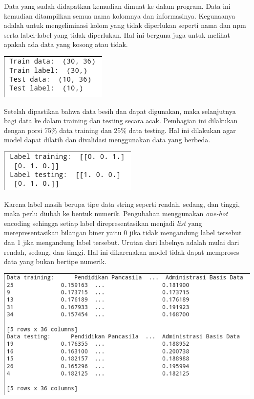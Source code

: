 \documentclass[12pt, a4paper]{article}
\begin{document}
\begin{multicols}{2}
\justifying
Data yang sudah didapatkan kemudian dimuat ke dalam program. Data ini kemudian ditampilkan semua nama kolomnya dan informasinya. Kegunaanya adalah untuk mengeliminasi kolom yang tidak diperlukan seperti nama dan npm serta label-label yang tidak diperlukan. Hal ini berguna juga untuk melihat apakah ada data yang kosong atau tidak.

\centering
\vspace{0.2cm}
\includegraphics[scale=0.9]{split_test}
\vspace{0.2cm}

\justifying
Setelah dipastikan bahwa data besih dan dapat digunakan, maka selanjutnya bagi data ke dalam training dan testing secara acak. Pembagian ini dilakukan dengan porsi 75\% data training dan 25\% data testing. Hal ini dilakukan agar model dapat dilatih dan divalidasi menggunakan data yang berbeda. \cite{scikit-learn} 

\centering
\vspace{0.2cm}
\includegraphics[scale=0.7]{encoded}
\vspace{0.2cm}

\justifying
Karena label masih berupa tipe data string seperti rendah, sedang, dan tinggi, maka perlu diubah ke bentuk numerik. Pengubahan menggunakan \textit{one-hot} encoding sehingga setiap label direpresentasikan menjadi \textit{list} yang merepresentasikan bilangan biner yaitu 0 jika tidak mengandung label tersebut dan 1 jika mengandung label tersebut. Urutan dari labelnya adalah mulai dari rendah, sedang, dan tinggi. Hal ini dikarenakan model tidak dapat memproses data yang bukan bertipe numerik.

\centering
\vspace{0.2cm}
\includegraphics[scale=0.3]{normalize}
\vspace{0.2cm}


\end{multicols}
\end{document}
